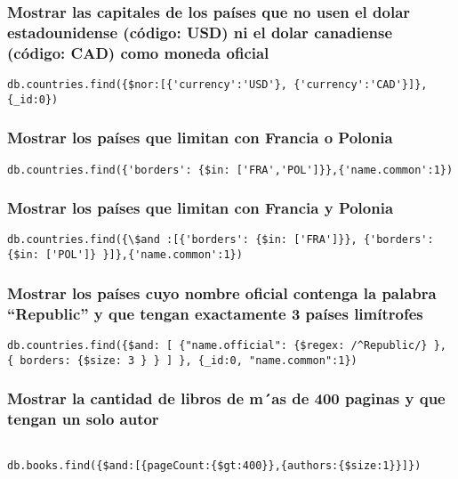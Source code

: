 \subsubsection*{Mostrar las capitales de los países que no usen el dolar estadounidense (código: USD) ni el dolar canadiense (código: CAD) como moneda oficial}

\begin{verbatim}
db.countries.find({$nor:[{'currency':'USD'}, {'currency':'CAD'}]},{_id:0})
\end{verbatim}


\subsubsection*{Mostrar los países que limitan con Francia o Polonia}

\begin{verbatim}
db.countries.find({'borders': {$in: ['FRA','POL']}},{'name.common':1})
\end{verbatim}

\subsubsection*{Mostrar los países que limitan con Francia y Polonia}

\begin{verbatim}
db.countries.find({\$and :[{'borders': {$in: ['FRA']}}, {'borders': {$in: ['POL']} }]},{'name.common':1})
\end{verbatim}

\subsubsection*{Mostrar los países cuyo nombre oficial contenga la palabra “Republic” y que tengan exactamente 3 países limítrofes}

\begin{verbatim}
db.countries.find({$and: [ {"name.official": {$regex: /^Republic/} },
{ borders: {$size: 3 } } ] }, {_id:0, "name.common":1})
\end{verbatim}


\subsubsection*{Mostrar la cantidad de libros de m´as de 400 paginas y que tengan un solo autor}

\begin{verbatim}

db.books.find({$and:[{pageCount:{$gt:400}},{authors:{$size:1}}]})

\end{verbatim}

